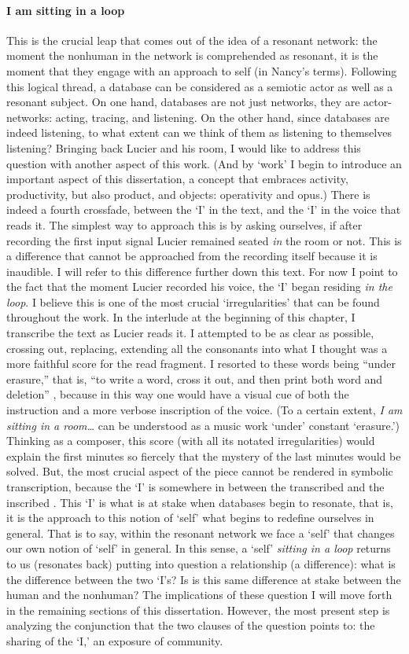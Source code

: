 \paragraph{I am sitting in a loop}
This is the crucial leap that comes out of the idea of a resonant network: the moment the nonhuman in the network is comprehended as resonant, it is the moment that they engage with an approach to self (in Nancy's terms). Following this logical thread, a database can be considered as a semiotic actor as well as a resonant subject. On one hand, databases are not just networks, they are actor-networks: acting, tracing, and listening. On the other hand, since databases are indeed listening, to what extent can we think of them as listening to themselves listening? Bringing back Lucier and his room, I would like to address this question with another aspect of this work. (And by `work' I begin to introduce an important aspect of this dissertation, a concept that embraces activity, productivity, but also product, and objects: operativity and opus.) There is indeed a fourth crossfade, between the `I' in the text, and the `I' in the voice that reads it. The simplest way to approach this is by asking ourselves, if after recording the first input signal Lucier remained seated \textit{in} the room or not. This is a difference that cannot be approached from the recording itself because it is inaudible. I will refer to this difference further down this text. For now I point to the fact that the moment Lucier recorded his voice, the `I' began residing \textit{in the loop}. I believe this is one of the most crucial `irregularities' that can be found throughout the work. In the interlude at the beginning of this chapter, I transcribe the text as Lucier reads it. I attempted to be as clear as possible, crossing out, replacing, extending all the consonants into what I thought was a more faithful score for the read fragment. I resorted to these words being ``under erasure,'' that is, ``to write a word, cross it out, and then print both word and deletion'' \parencite[xiv]{Der76:Of}, because in this way one would have a visual cue of both the instruction and a more verbose inscription of the voice. (To a certain extent, \textit{I am sitting in a room\dots} can be understood as a music work `under' constant `erasure.') Thinking as a composer, this score (with all its notated irregularities) would explain the first minutes so fiercely that the mystery of the last minutes would be solved. But, the most crucial aspect of the piece cannot be rendered in symbolic transcription, because the `I' is somewhere in between the transcribed and the inscribed . This `I' is what is at stake when databases begin to resonate, that is, it is the approach to this notion of `self' what begins to redefine ourselves in general. That is to say, within the resonant network we face a `self' that changes our own notion of `self' in general. In this sense, a `self' \textit{sitting in a loop} returns to us (resonates back) putting into question a relationship (a difference): what is the difference between the two `I's? Is is this same difference at stake between the human and the nonhuman? The implications of these question I will move forth in the remaining sections of this dissertation. However, the most present step is analyzing the conjunction that the two clauses of the question points to: the sharing of the `I,' an exposure of community.

